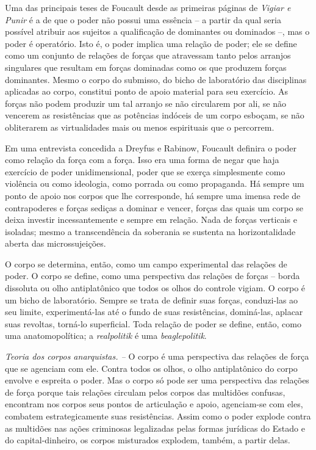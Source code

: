 Uma das principais teses de Foucault desde as primeiras páginas de
\emph{Vigiar e Punir} é a de que o poder não possui uma essência -- a
partir da qual seria possível atribuir aos sujeitos a qualificação de
dominantes ou dominados --, mas o poder é operatório. Isto é, o poder
implica uma relação de poder; ele se define como um conjunto de relações
de forças que atravessam tanto pelos arranjos singulares que resultam em
forças dominadas como os que produzem forças dominantes. Mesmo o corpo
do submisso, do bicho de laboratório das disciplinas aplicadas ao corpo,
constitui ponto de apoio material para seu exercício. As forças não
podem produzir um tal arranjo se não circularem por ali, se não vencerem
as resistências que as potências indóceis de um corpo esboçam, se não
obliterarem as virtualidades mais ou menos espirituais que o percorrem.

Em uma entrevista concedida a Dreyfus e Rabinow, Foucault definira o
poder como relação da força com a força. Isso era uma forma de negar que
haja exercício de poder unidimensional, poder que se exerça simplesmente
como violência ou como ideologia, como porrada ou como propaganda. Há
sempre um ponto de apoio nos corpos que lhe corresponde, há sempre uma
imensa rede de contrapoderes e forças sediças a dominar e vencer, forças
das quais um corpo se deixa investir incessantemente e sempre em
relação. Nada de forças verticais e isoladas; mesmo a transcendência da
soberania se sustenta na horizontalidade aberta das microssujeições.

O corpo se determina, então, como um campo experimental das relações de
poder. O corpo se define, como uma perspectiva das relações de forças --
borda dissoluta ou olho antiplatônico que todos os olhos do controle
vigiam. O corpo é um bicho de laboratório. Sempre se trata de definir
suas forças, conduzi-las ao seu limite, experimentá-las até o fundo de
suas resistências, dominá-las, aplacar suas revoltas, torná-lo
superficial. Toda relação de poder se define, então, como uma
anatomopolítica; a \emph{realpolitik }é uma \emph{beaglepolitik}.

\emph{Teoria dos corpos anarquistas. --} O corpo é uma perspectiva das
relações de força que se agenciam com ele. Contra todos os olhos, o olho
antiplatônico do corpo envolve e espreita o poder. Mas o corpo só pode
ser uma perspectiva das relações de força porque tais relações circulam
pelos corpos das multidões confusas, encontram nos corpos seus pontos de
articulação e apoio, agenciam-se com eles, combatem estrategicamente
suas resistências. Assim como o poder explode contra as multidões nas
ações criminosas legalizadas pelas formas jurídicas do Estado e do
capital-dinheiro, os corpos misturados explodem, também, a partir delas.

